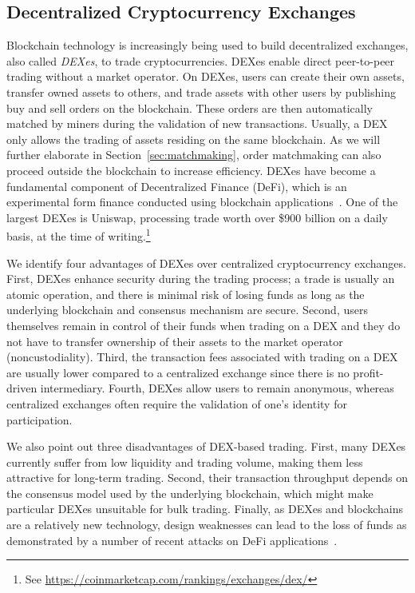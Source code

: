 
\subsection{Decentralized Cryptocurrency Exchanges}
Blockchain technology is increasingly being used to build decentralized exchanges, also called \emph{DEXes}, to trade cryptocurrencies.
DEXes enable direct peer-to-peer trading without a market operator.
On DEXes, users can create their own assets, transfer owned assets to others, and trade assets with other users by publishing buy and sell orders on the blockchain.
These orders are then automatically matched by miners during the validation of new transactions.
Usually, a DEX only allows the trading of assets residing on the same blockchain.
As we will further elaborate in Section~\ref{sec:matchmaking}, order matchmaking can also proceed outside the blockchain to increase efficiency.
DEXes have become a fundamental component of Decentralized Finance (DeFi), which is an experimental form finance conducted using blockchain applications~\cite{chen2020blockchain}.
One of the largest DEXes is Uniswap, processing trade worth over \$900 billion on a daily basis, at the time of writing.\footnote{See \url{https://coinmarketcap.com/rankings/exchanges/dex/}}

We identify four advantages of DEXes over centralized cryptocurrency exchanges.
First, DEXes enhance security during the trading process; a trade is usually an atomic operation, and there is minimal risk of losing funds as long as the underlying blockchain and consensus mechanism are secure.
Second, users themselves remain in control of their funds when trading on a DEX and they do not have to transfer ownership of their assets to the market operator (noncustodiality).
Third, the transaction fees associated with trading on a DEX are usually lower compared to a centralized exchange since there is no profit-driven intermediary.
Fourth, DEXes allow users to remain anonymous, whereas centralized exchanges often require the validation of one's identity for participation.

We also point out three disadvantages of DEX-based trading.
First, many DEXes currently suffer from low liquidity and trading volume, making them less attractive for long-term trading.
Second, their transaction throughput depends on the consensus model used by the underlying blockchain, which might make particular DEXes unsuitable for bulk trading.
Finally, as DEXes and blockchains are a relatively new technology, design weaknesses can lead to the loss of funds as demonstrated by a number of recent attacks on DeFi applications~\cite{gudgeon2020decentralized,qin2020attacking}.

